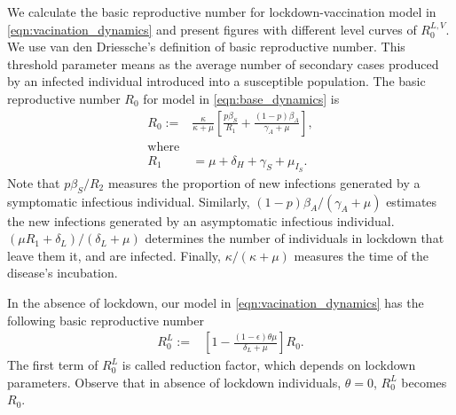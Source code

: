 %
We calculate the basic reproductive number for lockdown-vaccination model
in \cref{eqn:vacination_dynamics} and present figures with different level
curves of $R^{L,V}_0$. We use van den Driessche's
\cite{VandenDriessche2017a} definition of basic reproductive number. This
threshold parameter means as the average number of secondary cases produced
by an infected individual introduced into a susceptible population.
%
The basic reproductive number $R_0$ for model in \cref{eqn:base_dynamics} is
%
\begin{equation*}\label{eqn:reproductive_number}
    \begin{aligned}
        R_0 :=
        &
            \frac{\kappa}{\kappa + \mu}
            \left[
                \frac{p\beta_S}{R_1}
                + \frac{(1 - p) \beta_A}{\gamma_A+\mu}
            \right],
        \\
        \text{where}
        &
        \\
        R_1 &= \mu + \delta_H + \gamma_S + \mu_{I_{S}}.
    \end{aligned}
\end{equation*}
%
    Note that $p\beta_S/R_2$ measures the proportion of new infections generated
by a symptomatic infectious individual.
Similarly, $(1 - p) \beta_A / (\gamma_A+\mu)$
estimates the new infections generated by an asymptomatic infectious individual.
$(\mu R_1 + \delta_L) / (\delta_L + \mu)$ determines the number of individuals
in lockdown that leave them it, and are infected. Finally,
$\kappa /(\kappa + \mu)$ measures the time of the disease's incubation.

    In the absence of lockdown, our model in
\cref{eqn:vacination_dynamics} has the following basic reproductive number
%
\begin{equation*}
    \label{eqn:reproductive_numberLockdown}
    \begin{aligned}
        R^{L}_0 :=
        &
        \left[
            1 -
            \frac{(1 - \epsilon) \theta \mu}{\delta_L + \mu}
        \right] R_0.
    \end{aligned}
\end{equation*}
%
The first term of $R^{L}_0$ is called reduction factor, which depends on
lockdown parameters.
Observe that in absence of lockdown individuals, $\theta = 0$, $R^{L}_0$
becomes $R_0$.

